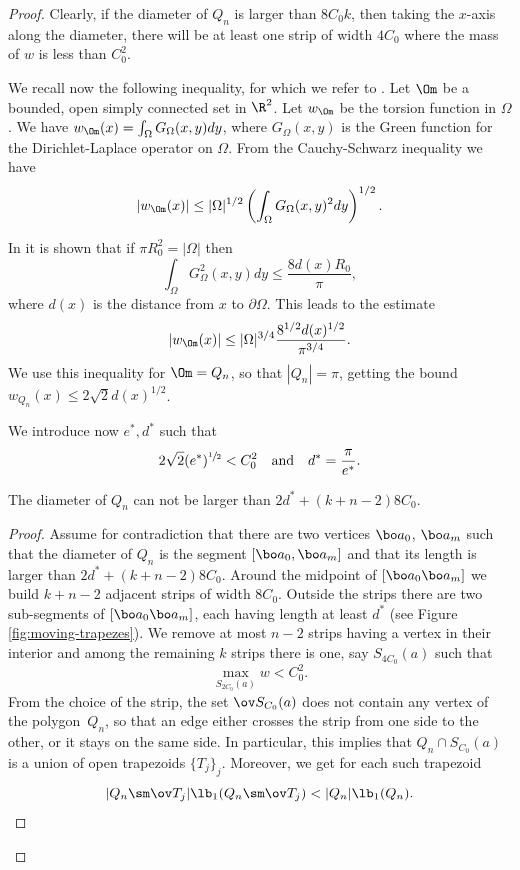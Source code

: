\begin{proof}
Clearly, if the diameter of $Q_n$ is larger than $8C_0k$, then taking the $x$-axis along the diameter, there will be at least one strip of width $4 C_0$ where the mass of $w$ is less than $C_0^2$.

We recall now the following inequality, for which we refer to \cite{BoVdB99}. Let $\Om$ be a bounded, open simply connected set in $\R^2$.
Let $w_\Om$ be the torsion function in $\Omega$.
We have
$w_\Om(x) = \int_\Omega G_\Omega(x,y)dy$, where $G_\Omega(x,y)$ is the Green function for the Dirichlet-Laplace operator on $\Omega$. From the Cauchy-Schwarz inequality we have
\[
|w_\Om(x)| \leq |\Omega|^{1/2} \left(\int_\Omega G_\Omega (x,y)^2dy\right)^{1/2}.
\]

In \cite[Proof of Th.\,1.5, Ineq.\,(5.16)]{BoVdB99} it is shown that if $\pi R_0^2=|\Omega|$ then
\[
\int_\Omega G_\Omega^2(x,y)dy \leq \frac{8 d(x)R_0}{\pi},
\]
where $d(x)$ is the distance from $x$ to $\partial \Omega$. This leads to the estimate
\begin{equation}\label{bb64.5}
|w_\Om(x)|\leq |\Omega|^{3/4}\frac{8^{1/2}d(x)^{1/2}}{\pi^{3/4}}.
\end{equation}
We use this inequality for $\Om=Q_n$, so that $|Q_n|=\pi$, getting the bound $w_{Q_n}(x) \le 2 \sqrt{2} d(x)^{1/2}$.

We introduce now $e^*, d^*$ such that
\begin{equation}\label{bb64.6}
2\sqrt{2} (e^*)^{\sfrac 12}< C_0^2\quad \mbox{and} \quad d^*=\frac{\pi}{e^*}.
\end{equation}

\begin{lemma}\label{bb64}
The diameter of $Q_n$ can not be larger than $2 d^* + (k+n-2)8 C_0$.
\end{lemma}

\begin{proof}
Assume for contradiction that there are two vertices $\bo a_0$, $\bo a_m$ such that the diameter of $Q_n$ is the segment $[\bo a_0, \bo a_m]$ and that its length is larger than $2 d^* + { (k+n-2)8 C_0} $.
{Around the midpoint of $[\bo a_0 \bo a_m]$ we build $k+n-2$ adjacent strips of width $8 C_0$. Outside the strips there are two sub-segments of $[\bo a_0 \bo a_m]$, each having length at least $d^*$ (see Figure \ref{fig:moving-trapezes}}). We remove at most $n-2$ strips having a vertex in their interior and among the remaining $k$ strips there is one, say $S_{4C_0}(a)$ such that
\[
\max _{S_{2C_0}(a)} w <C_0^2.
\]
From the choice of the strip, the set $\ov S_{C_0}(a)$ does not contain any vertex of the polygon~$Q_n$, so that an edge either crosses the strip from one side to the other, or it stays on the same side. In particular, this implies that $Q_n\cap S_{C_0}(a)$ is a union of open {trapezoids} $\{T_j\}_j$. Moreover, we get for each such {trapezoid}
\[
|Q_n\sm \ov T_j|\lb_1(Q_n\sm \ov T_j) < |Q_n| \lb_1(Q_n).
\]


\end{proof}
\end{proof}
